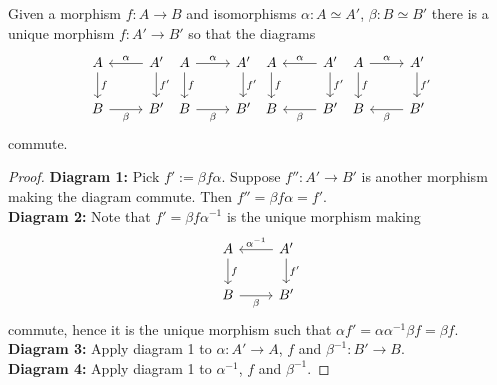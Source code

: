     \begin{lemma}\label{UniqueChangeOfDomainAndCodomainViaIsos}
        Given a morphism $f: A\rightarrow B$ and isomorphisms $\alpha: A\simeq A'$, $\beta : B\simeq B'$ there is a unique morphism $f: A' \rightarrow B'$ so that the diagrams
        $$
            \begin{tikzcd}
                A\arrow[d, "f"] & A'\arrow[l,"\alpha",swap]\arrow[d,"f'"]\\
                B \arrow[r,"\beta",swap] & B' 
            \end{tikzcd}
            \begin{tikzcd}
                A\arrow[r,"\alpha"]\arrow[d, "f"] & A'\arrow[d,"f'"]\\
                B \arrow[r,"\beta",swap] & B'
            \end{tikzcd}
            \begin{tikzcd}
                A\arrow[d, "f"] & A'\arrow[l,"\alpha",swap]\arrow[d,"f'"]\\
                B & B' \arrow[l,"\beta"]
            \end{tikzcd}
            \begin{tikzcd}
                A\arrow[d, "f"]\arrow[r,"\alpha"] & A' \arrow[d,"f'"] \\
                B & B' \arrow[l,"\beta"]
            \end{tikzcd}
        $$
        commute.
    \end{lemma}
    \begin{proof}
        \textbf{Diagram 1:} Pick $f':= \beta f\alpha$. Suppose $f'': A'\rightarrow B'$ is another morphism making the diagram commute. Then $f'' = \beta f \alpha = f'$.\\
        \textbf{Diagram 2:} Note that $f' = \beta f \alpha^{-1}$ is the unique morphism making  
        $$
            \begin{tikzcd}
                A\arrow[d, "f"] & A'\arrow[l,"\alpha^{-1}",swap]\arrow[d,"f'"]\\
                B \arrow[r,"\beta",swap] & B'
            \end{tikzcd}
        $$
        commute, hence it is the unique morphism such that $ \alpha f' =\alpha\alpha^{-1}\beta f = \beta f$.\\
        \textbf{Diagram 3:} Apply diagram 1 to $\alpha : A'\rightarrow A $, $f$ and $\beta^{-1}: B'\rightarrow B$.\\
        \textbf{Diagram 4:} Apply diagram 1 to $\alpha^{-1}$, $f$ and $\beta^{-1}$.
    \end{proof}
